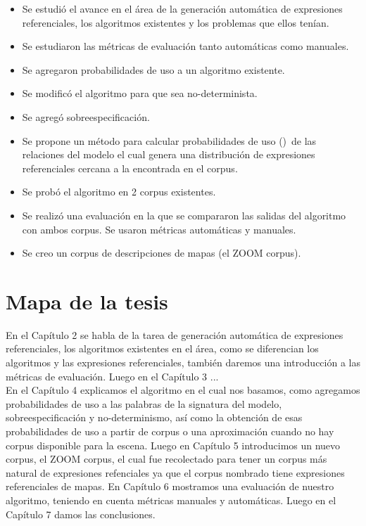 \begin{itemize}
\item Se estudi\'o el avance en el \'area de la generaci\'on autom\'atica de expresiones referenciales, los algoritmos existentes y los problemas que ellos ten\'ian.
\item Se estudiaron las m\'etricas de evaluaci\'on tanto autom\'aticas como manuales.
\item Se agregaron probabilidades de uso a un algoritmo existente.
\item Se modific\'o el algoritmo para que sea no-determinista.
\item Se agreg\'o sobreespecificaci\'on.
\item Se propone un m\'etodo para calcular probabilidades de uso (\puse)\ de las relaciones del modelo el cual genera una distribuci\'on de expresiones referenciales cercana a la encontrada en el corpus.
\item Se prob\'o el algoritmo en 2 corpus existentes.
\item Se realiz\'o una evaluaci\'on en la que se compararon las salidas del algoritmo con ambos corpus. Se usaron m\'etricas autom\'aticas y manuales.
\item Se creo un corpus de descripciones de mapas (el ZOOM corpus).
\end{itemize}

\section{Mapa de la tesis}
\label{sec:mapadetesis}

En el Cap\'itulo 2 se habla de la tarea de generaci\'on autom\'atica de expresiones referenciales, los algoritmos existentes en el \'area, como se diferencian los algoritmos y las expresiones referenciales, tambi\'en daremos una introducci\'on a las m\'etricas de evaluaci\'on. Luego en el Cap\'itulo 3 ...\\
En el Cap\'itulo 4 explicamos el algoritmo en el cual nos basamos, como agregamos probabilidades de uso a las palabras de la signatura del modelo, sobreespecificaci\'on y no-determinismo, as\'i como la obtenci\'on de esas probabilidades de uso a partir de corpus o una aproximaci\'on cuando no hay corpus disponible para la escena.
Luego en Cap\'itulo 5 introducimos un nuevo corpus, el ZOOM corpus, el cual fue recolectado para tener un corpus m\'as natural de expresiones refenciales ya que el corpus nombrado tiene expresiones referenciales de mapas.
En Cap\'itulo 6 mostramos una evaluaci\'on de nuestro algoritmo, teniendo en cuenta m\'etricas manuales y autom\'aticas. Luego en el Cap\'itulo 7 damos las conclusiones.